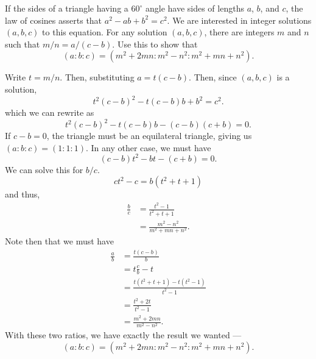 \documentclass[12 pt, letterpaper]{hmcpset}
\begin{document}
\begin{problem}[1]
	If the sides of a triangle having a $60^{\circ}$ angle have sides of lengths $a$, $b$, and $c$, the law of cosines asserts that $a^{2} - ab + b^{2} = c^{2}$. We are interested in integer solutions $(a, b, c)$ to this equation. For any solution $(a, b, c)$, there are integers $m$ and $n$ such that $m/n = a/(c - b)$. Use this to show that
	\[
		(a : b : c) = (m^{2} + 2 m n : m^{2} - n^{2} : m^{2} + mn + n^{2}).
	\]
\end{problem}

\begin{solution}
	Write $t = m/n$. Then, substituting  $a = t(c - b)$. Then, since $(a, b, c)$ is a solution,
	\[
		t^{2}(c - b)^{2} - t(c - b)b + b^{2} = c^{2}.
	\]
	which we can rewrite as
	\[
		t^{2} (c - b)^{2} - t(c - b)b - (c - b)(c + b) = 0.
	\]
	If $c - b = 0$, the triangle must be an equilateral triangle, giving us $(a : b : c) = (1 : 1 : 1)$. In any other case, we must have
	\[
		(c - b) t^{2} - bt - (c + b) = 0.
	\]
	We can solve this for $b/c$.
	\[
		c t^{2} - c = b(t^{2} + t + 1)
	\]
	and thus,
	\[
		\begin{split}
			\frac{b}{c} & = \frac{t^{2} - 1}{t^{2} + t + 1} \\
				    & = \frac{m^{2} - n^{2}}{m^{2} + mn + n^{2}}.
		\end{split}
	\]
	Note then that we must have
	\[
		\begin{split}
			\frac{a}{b} & = \frac{t(c - b)}{b} \\
				    & = t \frac{c}{b} - t \\
				    & = \frac{t(t^{2} + t + 1) - t(t^{2} - 1)}{t^{2} - 1} \\
				    & = \frac{t^{2} + 2t}{t^{2} - 1} \\
				    & = \frac{m^{2} + 2mn}{m^{2} - n^{2}}.
		\end{split}
	\]
	With these two ratios, we have exactly the result we wanted ---
	\[
		(a : b : c) = (m^{2} + 2mn : m^{2} - n^{2} : m^{2} + mn + n^{2}).
	\]
\end{solution}

\pagebreak
\end{document}

